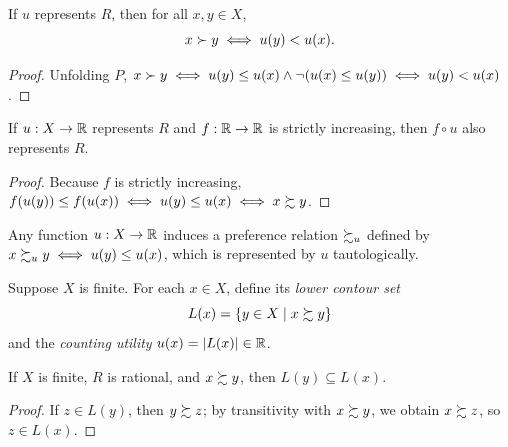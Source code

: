 \begin{lemma}
\label{lem:represents_P_iff}
\leanok
{}
If $u$ represents $R$, then for all $x, y \in X$,
\[
  x \succ y \iff u(y) < u(x).
\]
\end{lemma}
\begin{proof}
\leanok
Unfolding $P$, $x \succ y \iff u(y) \le u(x) \land \neg(u(x) \le u(y)) \iff u(y) < u(x)$.
\end{proof}

\begin{proposition}
\label{thm:comp_strictMono}
\leanok
{}
If $u : X \to \mathbb{R}$ represents $R$ and $f : \mathbb{R} \to \mathbb{R}$ is strictly increasing, then
$f \circ u$ also represents $R$.
\end{proposition}
\begin{proof}
\leanok
Because $f$ is strictly increasing, $f(u(y)) \le f(u(x)) \iff u(y) \le u(x) \iff x \succsim y$.
\end{proof}

\begin{definition}
\label{def:prefOf}
\leanok
{}
Any function $u : X \to \mathbb{R}$ induces a preference relation $\succsim_u$ defined by
$x \succsim_u y \iff u(y) \le u(x)$, which is represented by $u$ tautologically.
\end{definition}

\begin{definition}
\label{def:countingUtility}
\leanok
Suppose $X$ is finite. For each $x \in X$, define its \emph{lower contour set}
\[
  L(x) = \{y \in X \mid x \succsim y\}
\]
and the \emph{counting utility} $u(x) = |L(x)| \in \mathbb{R}$.
\end{definition}

\begin{lemma}
\label{lem:lowerContour_subset}
\leanok
{}
If $X$ is finite, $R$ is rational, and $x \succsim y$, then $L(y) \subseteq L(x)$.
\end{lemma}
\begin{proof}
\leanok
If $z \in L(y)$, then $y \succsim z$; by transitivity with $x \succsim y$, we obtain
$x \succsim z$, so $z \in L(x)$.
\end{proof}

